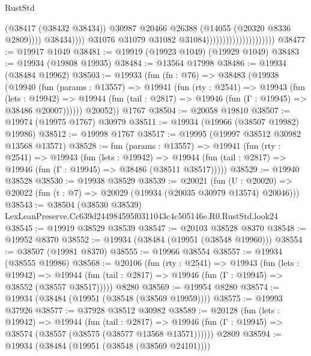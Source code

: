 \begin{lexlean}{RustStd}
\begin{coremodule}
                                                          (@38417 (@38432 @38434))
                                                          @30987
                                                          @20466
                                                          @26388
                                                          (@14055 (@20320 @8336 @2809))))
                                                      @38434))))
                                              @31076
                                              @31079
                                              @31082
                                              @31084)))))))))))))))))))))
@38477 := @19917 @1049
@38481 := @19919 (@19923 @1049) (@19929 @1049)
@38483 := @19934 (@19808 @19935)
@38484 := @13564 @17998
@38486 := @19934 (@38484 @19962)
@38503 := @19933
    (fun (fn : @76) =>
    @38483
      (@19938
        (@19940
          (fun (params : @13557) =>
          @19941
            (fun (rty : @2541) =>
            @19943
              (fun (lets : @19942) =>
              @19944 (fun (tail : @2817) => @19946 (fun (Γ : @19945) => @38486 @20007))))))
        @20052))
    @1767
@38504 := @20058 @19810
@38507 := @19974 (@19975 @1767) @30979
@38511 := @19934 (@19966 (@38507 @19982) @19986)
@38512 := @19998 @1767
@38517 := @19995 (@19997 @38512 @30982 @13568 @13571)
@38528 := fun (params : @13557) =>
  @19941
    (fun (rty : @2541) =>
    @19943
      (fun (lets : @19942) =>
      @19944 (fun (tail : @2817) => @19946 (fun (Γ : @19945) => @38486 (@38511 @38517)))))
@38529 := @19940 @38528
@38530 := @19938 @38529
@38539 := @20021
    (fun (U : @20020) => @20022 (fun (t : @7) => @20029 (@19934 (@20035 @30979 @13574) @20046)))
@38543 := @38504 (@38530 @38539) LexLeanPreserve.Cc639d244984595f0311043c4c505146e.R0.RustStd.look24
@38545 := @19919 @38529 @38539
@38547 := @20103 @38528 @8370
@38548 := @19952 @8370
@38552 := @19934 (@38484 (@19951 (@38548 @19960)))
@38554 := @38507 (@19981 @8370)
@38555 := @19966 @38554
@38557 := @19934 (@38555 @19986)
@38568 := @20106
    (fun (rty : @2541) =>
    @19943
      (fun (lets : @19942) =>
      @19944 (fun (tail : @2817) => @19946 (fun (Γ : @19945) => @38552 (@38557 @38517)))))
    @8280
@38569 := @19954 @8280
@38574 := @19934 (@38484 (@19951 (@38548 (@38569 @19959))))
@38575 := @19993 @37926
@38577 := @37928 @38512 @30982
@38589 := @20128
    (fun (lets : @19942) =>
    @19944
      (fun (tail : @2817) =>
      @19946 (fun (Γ : @19945) => @38574 (@38557 (@38575 (@38577 @13568 @13571))))))
    @2809
@38594 := @19934 (@38484 (@19951 (@38548 (@38569 @24101))))

\end{coremodule}
\end{lexlean}
